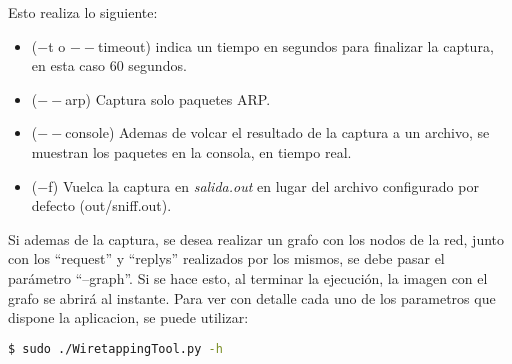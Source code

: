 Esto realiza lo siguiente:

\begin{itemize}
	\item ($-$t o $--$timeout) indica un tiempo en segundos para finalizar la captura, en esta caso 60 segundos.
	\item ($--$arp) Captura solo paquetes ARP.
	\item ($--$console) Ademas de volcar el resultado de la captura a un archivo, se muestran los paquetes en la consola, en tiempo real.
	\item ($-$f) Vuelca la captura en \textit{salida.out} en lugar del archivo configurado por defecto (out/sniff.out).
\end{itemize}

Si ademas de la captura, se desea realizar un grafo con los nodos de la red, junto con los ``request'' y ``replys'' realizados por los mismos, se debe pasar el parámetro ``--graph''. Si se hace esto, al terminar la ejecución, la imagen con el grafo se abrirá al instante. Para ver con detalle cada uno de los parametros que dispone la aplicacion, se puede utilizar:

\begin{lstlisting}[language=bash]
  $ sudo ./WiretappingTool.py -h
\end{lstlisting}